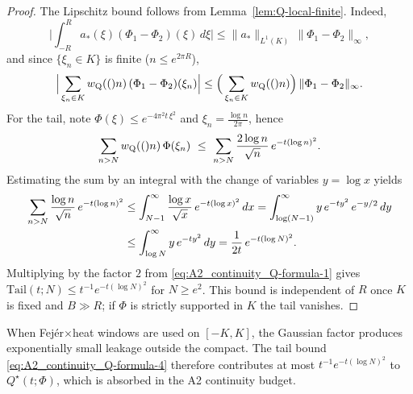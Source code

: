 \begin{proof}
The Lipschitz bound follows from Lemma~\ref{lem:Q-local-finite}. Indeed,
\begin{equation}\label{eq:A2_continuity_Q-formula-3}
\Big|\int_{-R}^{R} a_*(\xi)(\Phi_1-\Phi_2)(\xi)\,d\xi\Big|\le \|a_*\|_{L^1(K)}\,\|\Phi_1-\Phi_2\|_\infty,
\end{equation}
and since $\{\xi_n\in K\}$ is finite ($n\le e^{2\pi R}$),
\begin{equation}\label{eq:A2_continuity_Q-formula-2}
\Big|\sum_{\xi_n\in K} w_{\mathrm{Q}}(()n)\,(\Phi_1-\Phi_2)(\xi_n)\Big|\le \Big(\sum_{\xi_n\in K}w_{\mathrm{Q}}(()n)\Big)\,\|\Phi_1-\Phi_2\|_\infty.
\end{equation}
For the tail, note $\Phi(\xi)\le e^{-4\pi^2 t\,\xi^2}$ and $\xi_n=\tfrac{\log n}{2\pi}$, hence
\begin{equation}\label{eq:A2_continuity_Q-formula-1}
\sum_{n>N} w_{\mathrm{Q}}(()n)\,\Phi(\xi_n)\ \le\ \sum_{n>N} \frac{2\log n}{\sqrt n}\, e^{-t (\log n)^2}.
\end{equation}
Estimating the sum by an integral with the change of variables $y=\log x$ yields
\begin{align}\label{eq:A2_continuity_Q-formula}
\sum_{n>N} \frac{\log n}{\sqrt n}\, e^{-t (\log n)^2}
&\le \int_{N-1}^{\infty} \frac{\log x}{\sqrt x}\,e^{-t(\log x)^2}\,dx
= \int_{\log(N-1)}^{\infty} y\,e^{-t y^2}\,e^{-y/2}\,dy \notag\\
&\le \int_{\log N}^{\infty} y\,e^{-t y^2}\,dy
= \frac{1}{2t}\,e^{-t (\log N)^2}.
\end{align}
Multiplying by the factor $2$ from \eqref{eq:A2_continuity_Q-formula-1} gives
$\mathrm{Tail}(t;N)\le t^{-1} e^{-t (\log N)^2}$ for $N\ge e^2$.
This bound is independent of $R$ once $K$ is fixed and $B\gg R$; if $\Phi$ is strictly supported in $K$ the tail vanishes.
\end{proof}
\begin{remark}\label{rem:leakage}
When Fej\'er$\times$heat windows are used on $[-K,K]$, the Gaussian factor produces
exponentially small leakage outside the compact. The tail bound
\eqref{eq:A2_continuity_Q-formula-4} therefore contributes at most
$t^{-1}e^{-t(\log N)^2}$ to $Q^\star(t;\Phi)$, which is absorbed in the A2 continuity budget.
\end{remark}

